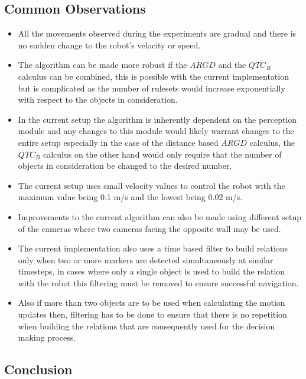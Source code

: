 \subsection{Common Observations}
\begin{itemize}
	\item All the movements observed during the experiments are gradual and there is no sudden change to the robot's velocity or speed.
	\item The algorithm can be made more robust if the $ARGD$ and the $QTC_B$ calculus can be combined, this is possible with the current implementation but is complicated as the number of rulesets would increase exponentially with respect to the objects in consideration.
	\item In the current setup the algorithm is inherently dependent on the perception module and any changes to this module would likely warrant changes to the entire setup especially in the case of the distance based $ARGD$ calculus, the $QTC_B$ calculus on the other hand would only require that the number of objects in consideration be changed to the desired number.
	\item The current setup uses small velocity values to control the robot with the maximum value being 0.1 m/s and the lowest being 0.02 m/s.
	\item Improvements to the current algorithm can also be made using different setup of the cameras where two cameras facing the opposite wall may be used.
	\item The current implementation also uses a time based filter to build relations only when two or more markers are detected simultaneously at similar timesteps, in cases where only a single object is used to build the relation with the robot this filtering must be removed to ensure successful navigation.
	\item Also if more than two objects are to be used when calculating the motion updates then, filtering has to be done to ensure that there is no repetition when building the relations that are consequently used for the decision making process.
\end{itemize}

\subsection{Conclusion} 
